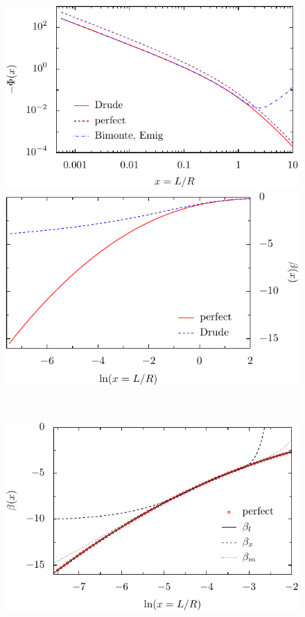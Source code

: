 \begin{figure}
  \begin{minipage}[b]{.5\linewidth}
  \centering
  \includegraphics[scale=0.79]{plots/hiT/hiT_perf_drude_emig_bimonte.pdf}
  \end{minipage}%
  \begin{minipage}[b]{.5\linewidth}
  \centering
  \includegraphics[scale=0.79]{plots/hiT/hiT_3_beta_vs_lnx.pdf}
  \end{minipage}
  \ \\
  \begin{minipage}[b]{.5\linewidth}
  \centering
  \includegraphics[scale=0.79]{plots/hiT/hiT_4_beta_vs_lnx_perfect_fits.pdf}

\end{minipage}
\end{figure}
